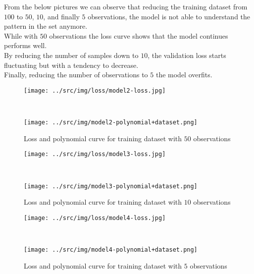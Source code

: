 \documentclass[a4paper,12pt]{article} %
\begin{document}
	From the below pictures we can observe that reducing the training dataset 
	from $100$ to $50$, $10$, and finally $5$ observations, the model is not 
	able to understand the pattern in the set anymore.  \\
	While with $50$ observations the loss curve shows that the model continues 
	performs well. \\
	By reducing the number of samples down to $10$, the validation loss starts 
	fluctuating but with a tendency to decrease.\\
	Finally, reducing the number of observations to $5$ the model overfits.
	
	\begin{figure}[H]
		\begin{minipage}[c]{.49\textwidth}
			\centering
			\texttt{[image: ../src/img/loss/model2-loss.jpg]}
		\end{minipage}
		~
		\begin{minipage}[c]{.49\textwidth}
			\centering
			\texttt{[image: ../src/img/model2-polynomial+dataset.png]}
		\end{minipage}
	\caption{Loss and polynomial curve for training dataset with $50$ 
	observations}
	\end{figure}
	
	\begin{figure}[H]
		\begin{minipage}[c]{.49\textwidth}
			\centering
			\texttt{[image: ../src/img/loss/model3-loss.jpg]}
		\end{minipage}
		~
		\begin{minipage}[c]{.49\textwidth}
			\centering
			\texttt{[image: ../src/img/model3-polynomial+dataset.png]}
		\end{minipage}
	\caption{Loss and polynomial curve for training dataset with $10$ 
		observations}
	\end{figure}
	
	\begin{figure}[H]
		\begin{minipage}[c]{.49\textwidth}
			\centering
			\texttt{[image: ../src/img/loss/model4-loss.jpg]}
		\end{minipage}
		~
		\begin{minipage}[c]{.49\textwidth}
			\centering
			\texttt{[image: ../src/img/model4-polynomial+dataset.png]}
		\end{minipage}
	\caption{Loss and polynomial curve for training dataset with $5$ 
	observations}
	\end{figure}
	
\end{document}
